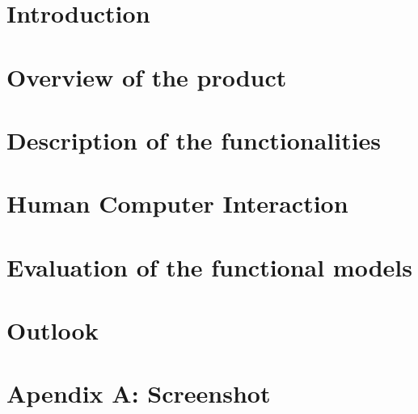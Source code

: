 \documentclass[a4paper]{article}
\begin{document}
	
	
	
	\clearpage
	
	\tableofcontents
	\clearpage
	
	\section{Introduction}
	
	
	\section{Overview of the product}
	
		
	\section{Description of the functionalities}
	
		
	\section{Human Computer Interaction}
	
		
	\section{Evaluation of the functional models}
	
		
	\section{Outlook}
	
	
	\section{Apendix A: Screenshot}
	
	
	\clearpage
	{}
	
	
\end{document}
